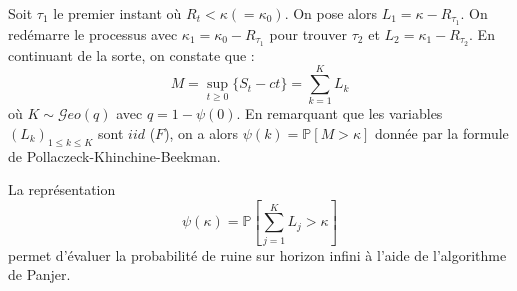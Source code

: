 
\begin{f}
	
	Soit $\tau_1$ le premier instant où $R_t<\kappa(=\kappa_0)$. On pose alors  $L_1=\kappa -R_{\tau_1}$.
	On redémarre le processus avec $\kappa_1=\kappa_0-R_{\tau_1}$ pour trouver  $\tau_2$ et $L_2=\kappa_1 -R_{\tau_2}$.
	En continuant de la sorte, on constate que :
	$$
	M=\sup_{t\geq 0}\{ S_t -ct \} =\sum_{k=1}^{K}L_k
	$$
	où $K\sim \mathcal{G}eo(q)$ avec $q=1-\psi(0)$.  
	En remarquant que les variables $\left(  L_k\right)_{1\leq k\leq K}$ sont $iid$ ($F$), on a alors $\psi(k)=\mathbb{P}[M>\kappa]$ donnée par la formule de Pollaczeck-Khinchine-Beekman.
	
	
	La représentation 
	$$
	\psi(\kappa)=\mathbb{P}\left[\sum_{j = 1}^{K}L_j>\kappa \right] 
	$$
	permet d'évaluer la probabilité de ruine sur horizon infini à l'aide de l'algorithme de Panjer.
	
\end{f}





